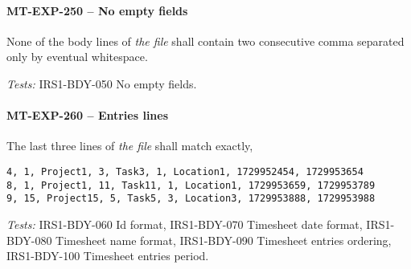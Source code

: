 \paragraph{MT-EXP-250 -- No empty fields}
None of the body lines of \emph{the file} shall contain
two consecutive comma separated only by eventual whitespace.

\textit{Tests: } IRS1-BDY-050 No empty fields.

\paragraph{MT-EXP-260 -- Entries lines}
The last three lines of \emph{the file} shall match exactly,

\begin{lstlisting}[numbers=none]
4, 1, Project1, 3, Task3, 1, Location1, 1729952454, 1729953654
8, 1, Project1, 11, Task11, 1, Location1, 1729953659, 1729953789
9, 15, Project15, 5, Task5, 3, Location3, 1729953888, 1729953988
\end{lstlisting}

\textit{Tests: } IRS1-BDY-060 Id format, IRS1-BDY-070 Timesheet date format,
IRS1-BDY-080 Timesheet name format, IRS1-BDY-090 Timesheet entries ordering,
IRS1-BDY-100 Timesheet entries period.
